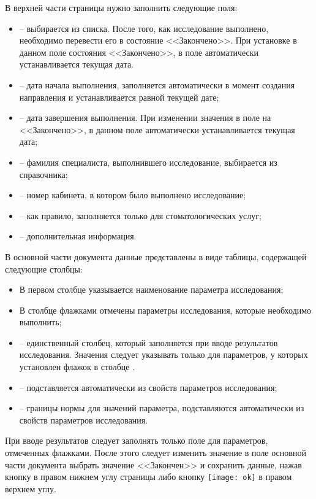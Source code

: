 {{В верхней части страницы нужно заполнить следующие поля: 

\begin{itemize}
 \item {} – выбирается из списка. После того, как  исследование выполнено, необходимо перевести его в состояние <<Закончено>>. При установке в данном поле состояния <<Закончено>>, в поле  автоматически устанавливается текущая дата.
 \item {} – дата начала выполнения, заполняется автоматически в момент создания направления и устанавливается равной текущей дате;
 \item {} – дата завершения выполнения. При изменении значения в поле  на <<Закончено>>, в данном поле автоматически устанавливается текущая дата;
 \item {} – фамилия специалиста, выполнившего исследование, выбирается из справочника;
 \item {} – номер кабинета, в котором было выполнено исследование;
 \item {} – как правило, заполняется только для стоматологических услуг;
 \item {} – дополнительная информация.
\end{itemize}

В основной части документа данные представлены в виде таблицы, содержащей следующие столбцы: 

\begin{itemize}
 \item В первом столбце указывается наименование параметра исследования;
 \item В столбце  флажками отмечены параметры исследования, которые необходимо выполнить;
 \item {} -- единственный столбец, который заполняется при вводе результатов исследования. Значения следует указывать только для параметров, у которых установлен флажок в столбце .
 \item {} -- подставляется автоматически из свойств параметров исследования;
 \item {} -- границы нормы для значений параметра, подставляются автоматически из свойств параметров исследования.
\end{itemize}

При вводе результатов следует заполнять только поле  для параметров, отмеченных флажками. После этого следует изменить значение в поле  основной части документа выбрать значение <<Закончен>> и сохранить данные, нажав кнопку  в правом нижнем углу страницы либо кнопку \texttt{[image: ok]} в правом верхнем углу.    

}}
